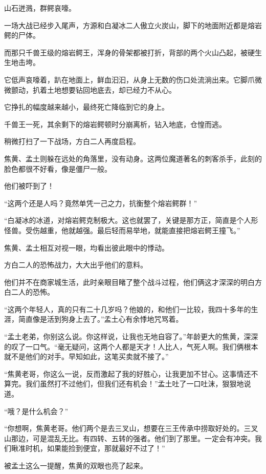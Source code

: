 
\begin{this_body}

山石迸溅，群鳄哀嚎。

一场大战已经步入尾声，方源和白凝冰二人傲立火炭山，脚下的地面附近都是熔岩鳄的尸体。

而那只千兽王级的熔岩鳄王，浑身的骨架都被打折，背部的两个火山凸起，被硬生生地击垮。

它低声哀嚎着，趴在地面上，鲜血汩汩，从身上无数的伤口处流淌出来。它脚爪微微颤动，扒着土地想要钻回地底去，却已经力不从心。

它挣扎的幅度越来越小，最终死亡降临到它的身上。

千兽王一死，其余剩下的熔岩鳄顿时分崩离析，钻入地底，仓惶而逃。

稍微打扫了一下战场，方白二人再度启程。

焦黄、孟土则躲在远处的角落里，没有动身。这两位魔道著名的刺客杀手，此刻的脸色都很不好看，像是僵尸一般。

他们被吓到了！

“这两个还是人吗？竟然单凭一己之力，抗衡整个熔岩鳄群！”

“白凝冰的冰道，对熔岩鳄克制极大。这也就罢了，关键是那方正，简直是个人形怪兽。受伤越重，他就越强。最后轻而易举地，就能直接把熔岩鳄王撞飞。”

焦黄、孟土相互对视一眼，均看出彼此眼中的悸动。

方白二人的恐怖战力，大大出乎他们的意料。

他们并不在商家城生活，此时亲眼目睹了整个战斗过程，他们俩这才深深的明白方白二人的恐怖。

“这两个年轻人，真的只有二十几岁吗？他娘的，和他们一比较，我四十多年的生涯，简直像是活到狗身上去了。”孟土心有余悸地咒骂着。

“孟土老弟，你别这么说。你这样说，让我也无地自容了。”年龄更大的焦黄，深深的叹了一口气。“毫无疑问，这两个人都是天才！人比人，气死人啊。我们俩根本就不是他们的对手。早知如此，这笔买卖就不接了。”

“焦黄老哥，你这么一说，反而激起了我的好胜心，让我更加不甘心。这事情还不算完。我们虽然打不过他们，但我们还有机会！”孟土吐了一口吐沫，狠狠地说道。

“哦？是什么机会？”

“你想啊，焦黄老哥。他们两个是去三叉山，想要在三王传承中捞取好处的。三叉山那边，可是混乱无比。有四转、五转的强者。他们到了那里。一定会有冲突。我们瞅准时机，如果能捡到便宜，那就最好不过了！”

被孟土这么一提醒，焦黄的双眼也亮了起来。


\end{this_body}

